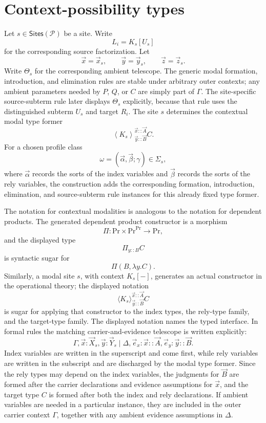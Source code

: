 \documentclass[11pt]{article}
\newcommand{\Proc}{\mathrm{Pr}}
\newcommand{\ty}{\mathrel{::}}
\newcommand{\Sites}{\mathsf{Sites}}
\newcommand{\Sig}{\Sigma}
\newcommand{\Mod}[4]{\left\langle #1\right\rangle^{#2}_{#3} #4}
\begin{document}
\section{Context-possibility types}
\label{sec:context-possibility-types}

Let \(s\in\Sites(\mathcal{P})\) be a site. Write
\[
  L_i=K_s[U_s]
\]
for the corresponding source factorization. Let
\[
  \vec{x}=\vec{x}_s,
  \qquad
  \vec{y}=\vec{y}_s,
  \qquad
  \vec{z}=\vec{z}_s.
\]
Write \(\Theta_s\) for the corresponding ambient telescope.  The generic modal
formation, introduction, and elimination rules are stable under arbitrary outer
contexts; any ambient parameters needed by \(P\), \(Q\), or \(C\) are simply part
of \(\Gamma\).  The site-specific source-subterm rule later displays \(\Theta_s\)
explicitly, because that rule uses the distinguished subterm \(U_s\) and target
\(R_i\). The site \(s\) determines the contextual modal type former
\[
  \Mod{K_s}{\vec{x}\ty\vec{A}}{\vec{y}\ty\vec{B}}{C}.
\]
For a chosen profile class
\[
  \omega=(\vec{\alpha},\vec{\beta};\gamma)\in\Sig_s,
\]
where \(\vec\alpha\) records the sorts of the index variables and
\(\vec\beta\) records the sorts of the rely variables, the construction adds the corresponding formation, introduction, elimination, and source-subterm rule instances for this already fixed type former.

The notation for contextual modalities is analogous to the notation for
dependent products.  The generated dependent product constructor is a morphism
\[
  \Pi:\Proc\times\Proc^{\Proc}\longrightarrow\Proc,
\]
and the displayed type
\[
  \Pi_{y\ty B}C
\]
is syntactic sugar for
\[
  \Pi(B,\lambda y.C).
\]
Similarly, a modal site \(s\), with context \(K_s[-]\), generates an actual
constructor in the operational theory; the displayed notation
\[
  \langle K_s\rangle^{\vec{x}\ty\vec{A}}_{\vec{y}\ty\vec{B}}C
\]
is sugar for applying that constructor to the index types, the rely-type
family, and the target-type family.  The displayed notation names the typed
interface.  In formal rules the matching carrier-and-evidence telescope is
written explicitly:
\[
  \Gamma,\vec{x}:\vec X_s,\vec{y}:\vec Y_s
  \mid
  \Delta,\vec e_x:\vec{x}\ty\vec{A},\vec e_y:\vec{y}\ty\vec{B}.
\]
Index variables are written in the superscript and come first, while rely
variables are written in the subscript and are discharged by the modal type
former.  Since the rely types may depend on the index variables, the judgments
for \(\vec{B}\) are formed after the carrier declarations and evidence
assumptions for \(\vec{x}\), and the target type \(C\) is formed after both the
index and rely declarations.  If ambient variables are needed in a particular
instance, they are included in the outer carrier context \(\Gamma\), together with
any ambient evidence assumptions in \(\Delta\).
\end{document}
